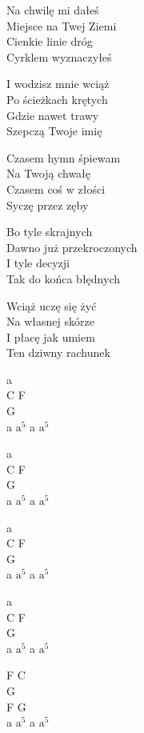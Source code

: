 \begin{text}
    Na chwilę mi dałeś\\
    Miejsce na Twej Ziemi\\
    Cienkie linie dróg\\
    Cyrklem wyznaczyłeś

    I wodzisz mnie wciąż\\
    Po ścieżkach krętych\\
    Gdzie nawet trawy\\
    Szepczą Twoje imię

    Czasem hymn śpiewam\\
    Na Twoją chwałę\\
    Czasem coś w złości\\
    Syczę przez zęby

    Bo tyle skrajnych\\
    Dawno już przekroczonych\\
    I tyle decyzji\\
    Tak do końca błędnych

    Wciąż uczę się żyć\\
    Na własnej skórze\\
    I płacę jak umiem\\
    Ten dziwny rachunek
\end{text}
\begin{chord}
    a\\
    C F\\
    G\\
    a $\mathrm{a^{5}}$ a $\mathrm{a^{5}}$

    a\\
    C F\\
    G\\
    a $\mathrm{a^{5}}$ a $\mathrm{a^{5}}$

    a\\
    C F\\
    G\\
    a $\mathrm{a^{5}}$ a $\mathrm{a^{5}}$

    a\\
    C F\\
    G\\
    a $\mathrm{a^{5}}$ a $\mathrm{a^{5}}$

    F C\\
    G\\
    F G\\
    a $\mathrm{a^{5}}$ a $\mathrm{a^{5}}$
\end{chord}
